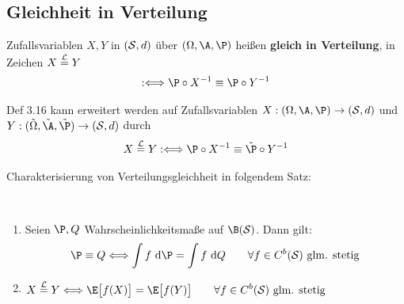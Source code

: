 \subsection*{Gleichheit in Verteilung} %
\begin{definition}\label{def3.16}
	Zufallsvariablen $X,Y$ in $(\S,d)$ über $(\Omega,\A,\P)$ heißen \textbf{gleich in Verteilung}, in Zeichen $X\stackeq{\mathcal{L}} Y$
	\begin{align*}
		:\Longleftrightarrow \P\circ X^{-1}\equiv\P\circ Y^{-1}
	\end{align*}
\end{definition}

\begin{bemerkung} %
	Def 3.16 kann erweitert werden auf Zufallsvariablen $X:(\Omega,\A,\P)\to(\S,d)$ und $Y:(\tilde{\Omega},\tilde{\A},\tilde{\P})\to(\S,d)$ durch
	\begin{align*}
		X\stackeq{\mathcal{L}} Y:\Longleftrightarrow\P\circ X^{-1}\equiv\tilde{\P}\circ Y^{-1}
	\end{align*}
\end{bemerkung}

Charakterisierung von Verteilungsgleichheit in folgendem Satz:

\begin{satz}\label{satz3.17}\
	\begin{enumerate}[label=(\arabic*)]
		\item Seien $\P,Q$ Wahrscheinlichkeitsmaße auf $\B(\S)$. Dann gilt:
		\begin{align*}
			\P\equiv Q\Longleftrightarrow
			\int\limits f\d\P=\int\limits f\d Q\qquad\forall f\in C^b(\S)\text{ glm. stetig}
		\end{align*}
		\item $\begin{aligned}
			X\stackeq{\mathcal{L}} Y\Longleftrightarrow
			\E\big[f(X)\big]=\E\big[f(Y)\big]\qquad\forall f\in C^b(\S)\text{ glm. stetig}
		\end{aligned}$
	\end{enumerate}
\end{satz}

